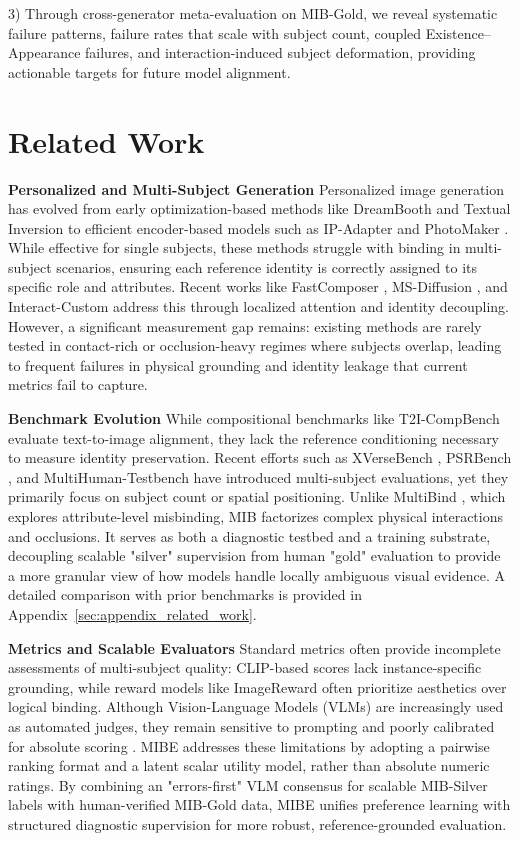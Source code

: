 \documentclass{article}
\begin{document}
3) Through cross-generator meta-evaluation on MIB-Gold, we reveal systematic failure patterns, failure rates that scale with subject count, coupled Existence--Appearance failures, and interaction-induced subject deformation, providing actionable targets for future model alignment.

\section{Related Work}
\textbf{Personalized and Multi-Subject Generation}
Personalized image generation has evolved from early optimization-based methods like DreamBooth \cite{ruiz2023dreambooth} and Textual Inversion \cite{gal2022image} to efficient encoder-based models such as IP-Adapter \cite{ye2023ip} and PhotoMaker \cite{li2024photomaker}. While effective for single subjects, these methods struggle with binding in multi-subject scenarios, ensuring each reference identity is correctly assigned to its specific role and attributes. Recent works like FastComposer \cite{xiao2023fastcomposer}, MS-Diffusion \cite{wang2024ms}, and Interact-Custom \cite{xu2025interactcustom} address this through localized attention and identity decoupling. However, a significant measurement gap remains: existing methods are rarely tested in contact-rich or occlusion-heavy regimes where subjects overlap, leading to frequent failures in physical grounding and identity leakage that current metrics fail to capture.

\textbf{Benchmark Evolution}
While compositional benchmarks like T2I-CompBench \cite{huang2023t2i} evaluate text-to-image alignment, they lack the reference conditioning necessary to measure identity preservation. Recent efforts such as XVerseBench \cite{chen2025xverse}, PSRBench \cite{wang2025psr}, and MultiHuman-Testbench \cite{borse2025multihuman} have introduced multi-subject evaluations, yet they primarily focus on subject count or spatial positioning.
Unlike MultiBind \cite{tian2026multibind}, which explores attribute-level misbinding, MIB factorizes complex physical interactions and occlusions. It serves as both a diagnostic testbed and a training substrate, decoupling scalable "silver" supervision from human "gold" evaluation to provide a more granular view of how models handle locally ambiguous visual evidence. A detailed comparison with prior benchmarks is provided in Appendix~\ref{sec:appendix_related_work}.

\textbf{Metrics and Scalable Evaluators}
Standard metrics often provide incomplete assessments of multi-subject quality: CLIP-based scores lack instance-specific grounding, while reward models like ImageReward \cite{xu2023imagereward} often prioritize aesthetics over logical binding. Although Vision-Language Models (VLMs) are increasingly used as automated judges, they remain sensitive to prompting and poorly calibrated for absolute scoring \cite{kumar2026vlm}. MIBE addresses these limitations by adopting a pairwise ranking format and a latent scalar utility model, rather than absolute numeric ratings. By combining an "errors-first" VLM consensus for scalable MIB-Silver labels with human-verified MIB-Gold data, MIBE unifies preference learning with structured diagnostic supervision for more robust, reference-grounded evaluation.
\end{document}

